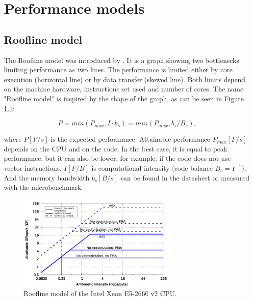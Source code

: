 \chapter{Performance models}

\section{Roofline model}


The Roofline model was introduced by \cite{williams-2009}. It is a graph showing two bottlenecks limiting  performance as two lines. The performance is limited either by core execution (horizontal line) or by data transfer (skewed line). Both limits depend on the machine hardware, instructions set used and number of cores.
The name "Roofline model" is inspired by the shape of the graph, as can be seen in Figure \ref{fig:roofline_emmy}:



\begin{equation}
   P = min(P_{max}, I \cdot b_s) = min(P_{max}, b_s / B_c),
\end{equation}

\noindent
where $P [F/s]$ is the expected performance.
Attainable performance $P_{max} [F/s]$ depends on the CPU and on the code. In the best case, it is equal to peak performance, but it can also be lower, for example, if the code does not use vector instructions. $I [F/B]$ is computational intensity (code balance $B_c = I^{-1}$). And the memory bandwidth $b_s [B/s]$ can be found in the datasheet or measured with the microbenchmark.

\begin{figure}[H]
   \centering
   \includegraphics[width=0.7\textwidth,clip=true]{images/roofline_emmy_Xeon2660v2}
   \caption{Roofline model of the  Intel Xeon E5-2660 v2 CPU. }
  \label{fig:roofline_emmy}
\end{figure}

